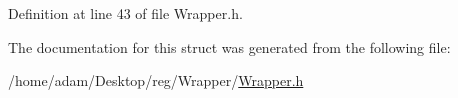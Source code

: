 Definition at line 43 of file Wrapper.\+h.



The documentation for this struct was generated from the following file\+:\begin{DoxyCompactItemize}
\item 
/home/adam/\+Desktop/reg/\+Wrapper/\hyperlink{_wrapper_8h}{Wrapper.\+h}\end{DoxyCompactItemize}
